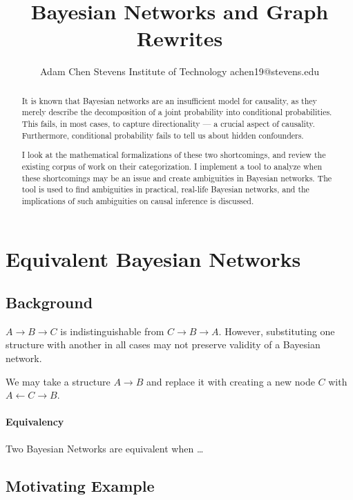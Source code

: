\documentclass{article}
\title{Bayesian Networks and Graph Rewrites}
\author{
	Adam Chen
	\affiliations
	Stevens Institute of Technology
	\emails
	achen19@stevens.edu
}
\begin{document}
	
	\maketitle
	
	\begin{abstract}
		It is known that Bayesian networks are an insufficient model for causality, as they merely describe the decomposition of a joint probability into conditional probabilities.
		This fails, in most cases, to capture directionality --- a crucial aspect of causality.
		Furthermore, conditional probability fails to tell us about hidden confounders.
		
		I look at the mathematical formalizations of these two shortcomings, and review the existing corpus of work on their categorization.
		I implement a tool to analyze when these shortcomings may be an issue and create ambiguities in Bayesian networks.
		The tool is used to find ambiguities in practical, real-life Bayesian networks, and the implications of such ambiguities on causal inference is discussed.
	\end{abstract}
	
		
	\section{Equivalent Bayesian Networks}
	\subsection{Background}
	$A \rightarrow B \rightarrow C$ is indistinguishable from $C \rightarrow B \rightarrow A$. However, substituting one structure with another in all cases may not preserve validity of a Bayesian network.
	
	We may take a structure $A \rightarrow B$ and replace it with creating a new node $C$ with $A \leftarrow C \rightarrow B$.
	
	\paragraph{Equivalency} Two Bayesian Networks are equivalent when \dots
	
	\subsection{Motivating Example}
	
\end{document}
